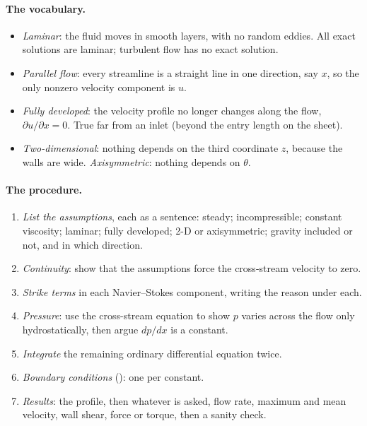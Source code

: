 \paragraph{The vocabulary.}
\begin{itemize}[nosep,leftmargin=*]
\item \emph{Laminar}: the fluid moves in smooth layers, with no random eddies. All exact solutions are laminar; turbulent flow has no exact solution.
\item \emph{Parallel flow}: every streamline is a straight line in one direction, say $x$, so the only nonzero velocity component is $u$.
\item \emph{Fully developed}: the velocity profile no longer changes along the flow, $\partial u/\partial x = 0$. True far from an inlet (beyond the entry length on the sheet).
\item \emph{Two-dimensional}: nothing depends on the third coordinate $z$, because the walls are wide. \emph{Axisymmetric}: nothing depends on $\theta$.
\end{itemize}

\paragraph{The procedure.}
\begin{enumerate}[nosep,leftmargin=*]
\item \emph{List the assumptions}, each as a sentence: steady; incompressible; constant viscosity; laminar; fully developed; 2-D or axisymmetric; gravity included or not, and in which direction.
\item \emph{Continuity}: show that the assumptions force the cross-stream velocity to zero.
\item \emph{Strike terms} in each Navier--Stokes component, writing the reason under each.
\item \emph{Pressure}: use the cross-stream equation to show $p$ varies across the flow only hydrostatically, then argue $dp/dx$ is a constant.
\item \emph{Integrate} the remaining ordinary differential equation twice.
\item \emph{Boundary conditions} (): one per constant.
\item \emph{Results}: the profile, then whatever is asked, flow rate, maximum and mean velocity, wall shear, force or torque, then a sanity check.
\end{enumerate}

